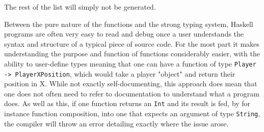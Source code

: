 \documentclass[12pt, a4paper]{report}
\begin{document}
The rest of the list will simply not be generated.
\par
Between the pure nature of the functions and the strong typing system, Haskell programs are often very easy to read and debug once a user understands the syntax and structure of a typical piece of source code.
For the most part it makes understanding the purpose and function of functions considerably easier, with the ability to user-define types meaning that one can have a function of type \verb|Player -> PlayerXPosition|, which would take a player "object" and return their position in X.
While not exactly self-documenting, this approach does mean that one does not often need to refer to documentation to understand what a program does.
As well as this, if one function returns an \verb|Int| and its result is fed, by for instance function composition, into one that expects an argument of type \verb|String|, the compiler will throw an error detailing exactly where the issue arose.
\end{document}
